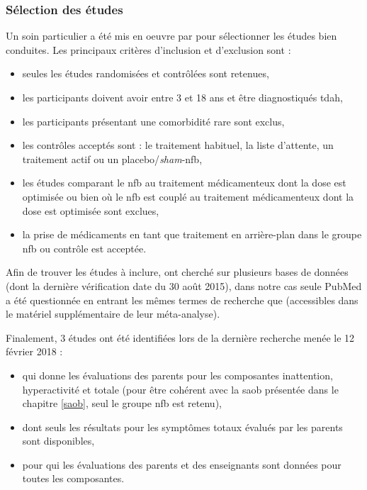 \subsubsection{Sélection des études}
Un soin particulier a été mis en oeuvre par \citet{Cortese2016} pour sélectionner les études bien conduites. Les principaux critères d'inclusion
et d'exclusion sont \citep{Cortese2016} :
\begin{itemize}
\item seules les études randomisées et contrôlées sont retenues,
\item les participants doivent avoir entre 3 et 18 ans et être diagnostiqués \gls{tdah},
\item les participants présentant une comorbidité rare sont exclus,
\item les contrôles acceptés sont : le traitement habituel, la liste d'attente, un traitement actif ou un placebo/\textit{sham}-\gls{nfb},
\item les études comparant le \gls{nfb} au traitement médicamenteux dont la dose est optimisée ou bien où le \gls{nfb} est couplé au traitement médicamenteux
dont la dose est optimisée sont exclues,
\item la prise de médicaments en tant que traitement en arrière-plan dans le groupe \gls{nfb} ou contrôle est acceptée.
\end{itemize}

Afin de trouver les études à inclure, \citet{Cortese2016} ont cherché sur plusieurs bases de données (dont la dernière vérification
date du 30 août 2015), dans notre cas seule PubMed a été questionnée en
entrant les mêmes termes de recherche que \citet{Cortese2016} (accessibles dans le matériel supplémentaire de leur méta-analyse).

Finalement, 3 études ont été identifiées lors de la dernière recherche menée le 12 février 2018 : 
\begin{itemize}
\item \citep{Bazanova2018} qui donne les évaluations des parents pour les composantes inattention, hyperactivité et totale (pour être cohérent avec 
la \gls{saob} présentée dans le chapitre \ref{saob}, seul le groupe \gls{nfb} est retenu),
\item \citep{Baumeister2016} dont seuls les résultats pour les symptômes totaux évalués par les parents sont disponibles,
\item \citep{Strehl2017} pour qui les évaluations des parents et des enseignants sont données pour toutes les composantes.
\end{itemize}


